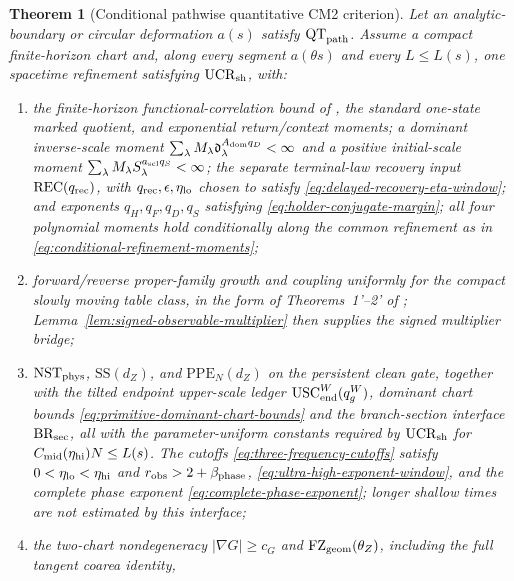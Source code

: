 \documentclass[11pt]{article}
\newtheorem{theorem}{Theorem}[section]
\begin{document}
\begin{theorem}[Conditional pathwise quantitative CM2 criterion]
\label{thm:global-cm2-assembly}
Let an analytic-boundary or circular deformation $a(s)$ satisfy
$\mathrm{QT}_{\rm path}$.
Assume a compact finite-horizon chart and, along every segment
$a(\theta s)$ and every $L\le L(s)$, one spacetime refinement satisfying
$\mathrm{UCR}_{\rm sh}$, with:
\begin{enumerate}[label=\textup{(H\arabic*)}]
\item the finite-horizon functional-correlation bound of \cite{LS}, the
      standard one-state marked quotient, and exponential return/context
      moments; a dominant inverse-scale moment
      $\sum_\lambda M_\lambda
      \mathfrak d_\lambda^{A_{\rm dom}q_D}<\infty$ and a positive initial-scale
      moment $\sum_\lambda M_\lambda
      S_\lambda^{a_{\rm scl}q_S}<\infty$; the separate terminal-law
      recovery input $\mathrm{REC}(q_{\rm rec})$, with
      $q_{\rm rec},\epsilon,\eta_{\rm lo}$ chosen to satisfy
      \eqref{eq:delayed-recovery-eta-window}; and
      exponents $q_H,q_F,q_D,q_S$ satisfying
      \eqref{eq:holder-conjugate-margin}; all four polynomial moments hold conditionally
      along the common refinement as in
      \eqref{eq:conditional-refinement-moments};
\item forward/reverse proper-family growth and coupling uniformly for the
      compact slowly moving table class, in the form of Theorems~1'--2' of
      \cite{SYZ}; Lemma~\ref{lem:signed-observable-multiplier} then supplies
      the signed multiplier bridge;
\item $\mathrm{NST}_{\rm phys}$, $\mathrm{SS}(d_Z)$, and
      $\mathrm{PPE}_{N}(d_Z)$ on the persistent clean gate, together with the
      tilted endpoint upper-scale ledger $\mathrm{USC}_{\rm end}^{W}(q_g^W)$,
      dominant chart bounds \eqref{eq:primitive-dominant-chart-bounds} and
      the branch-section interface $\mathrm{BR}_{\rm sec}$, all with the
      parameter-uniform constants required by $\mathrm{UCR}_{\rm sh}$ for
      $C_{\rm mid}(\eta_{\rm hi})N\le L(s)$.  The cutoffs
      \eqref{eq:three-frequency-cutoffs} satisfy
      $0<\eta_{\rm lo}<\eta_{\rm hi}$ and
      $r_{\rm obs}>2+\beta_{\rm phase}$,
      \eqref{eq:ultra-high-exponent-window}, and the complete phase exponent
      \eqref{eq:complete-phase-exponent}; longer shallow times are not estimated
      by this interface;
\item the two-chart nondegeneracy $|\nabla G|\ge c_G$ and
      $\mathrm{FZ}_{\rm geom}(\theta_Z)$, including the full tangent coarea identity,

\end{enumerate}
\end{theorem}
\end{document}
